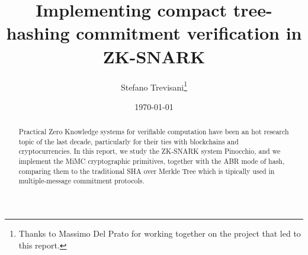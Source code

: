 \documentclass{article}
\author{Stefano Trevisani\footnote{Thanks to Massimo Del Prato for 
working together on the project that led to this report.}}
\date{\today}
\title{Implementing compact tree-hashing commitment verification in ZK-SNARK}
\theoremstyle{definition}
\theoremstyle{theorem}
\theoremstyle{example}
\begin{document}
\maketitle
\begin{abstract}
	Practical Zero Knowledge systems for verifiable computation have been an hot research topic
	of the last decade, particularly for their ties with blockchains and cryptocurrencies.
	In this report, we study the ZK-SNARK system Pinocchio, and we implement the MiMC cryptographic
	primitives, together with the ABR mode of hash, comparing them to the traditional SHA over Merkle
	Tree which is tipically used in multiple-message commitment protocols.
\end{abstract}
\clearpage
\tableofcontents





\end{document}
